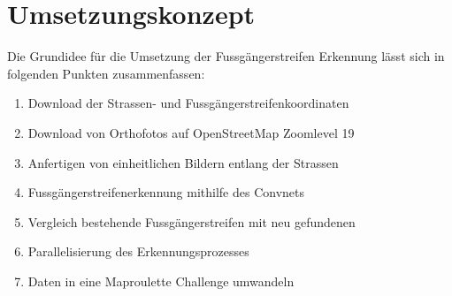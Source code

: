 \section{Umsetzungskonzept}
Die Grundidee für die Umsetzung der Fussgängerstreifen Erkennung lässt sich in folgenden Punkten zusammenfassen:
\begin{enumerate}
	\item Download der Strassen- und Fussgängerstreifenkoordinaten
	\item Download von Orthofotos auf \Gls{OpenStreetMap} Zoomlevel 19
	\item Anfertigen von einheitlichen Bildern entlang der Strassen
	\item Fussgängerstreifenerkennung mithilfe des Convnets
	\item Vergleich bestehende Fussgängerstreifen mit neu gefundenen
	\item Parallelisierung des Erkennungsprozesses
	\item Daten in eine Maproulette Challenge umwandeln
\end{enumerate}







